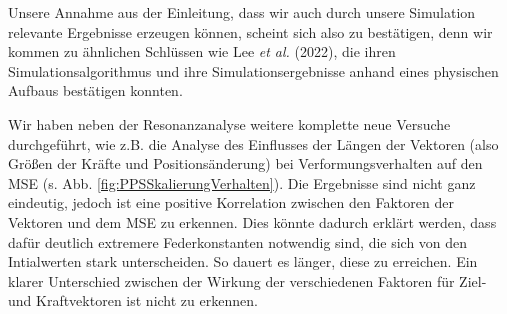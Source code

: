 \documentclass[10pt]{scrartcl}
\newcommand{\lee}{Lee {\itshape et al.} (2022)}
\begin{document}
Unsere Annahme aus der Einleitung, dass wir auch durch unsere Simulation relevante Ergebnisse erzeugen können, scheint sich also zu bestätigen, denn wir kommen zu ähnlichen Schlüssen wie \lee{}, die ihren Simulationsalgorithmus und ihre Simulationsergebnisse anhand eines physischen Aufbaus bestätigen konnten.

Wir haben neben der Resonanzanalyse weitere komplette neue Versuche durchgeführt, wie z.B. die Analyse des Einflusses der Längen der Vektoren (also Größen der Kräfte und Positionsänderung) bei Verformungsverhalten auf den MSE (s. Abb. \ref{fig:PPSSkalierungVerhalten}). Die Ergebnisse sind nicht ganz eindeutig, jedoch ist eine positive Korrelation zwischen den Faktoren der Vektoren und dem MSE zu erkennen. Dies könnte dadurch erklärt werden, dass dafür deutlich extremere Federkonstanten notwendig sind, die sich von den Intialwerten stark unterscheiden. So dauert es länger, diese zu erreichen. Ein klarer Unterschied zwischen der Wirkung der verschiedenen Faktoren für Ziel- und Kraftvektoren ist nicht zu erkennen.
\end{document}

